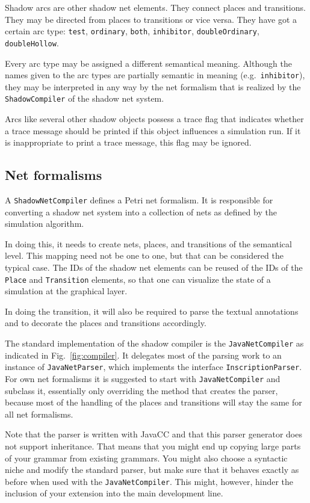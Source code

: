 Shadow arcs are other shadow net elements. They connect
places and transitions. They may be directed from places
to transitions or vice versa. They have got a certain
arc type: \texttt{test}, \texttt{ordinary}, \texttt{both},
\texttt{inhibitor}, \texttt{doubleOrdinary}, \texttt{doubleHollow}.


Every arc type may be assigned a different semantical meaning.
Although the names given to the arc types are partially
semantic in meaning (e.g.~\texttt{inhibitor}), they may be interpreted
in any way by the net formalism that is realized by
the \texttt{ShadowCompiler} of the shadow net system.

Arcs like several other shadow objects possess a trace flag
that indicates whether a trace message should be printed 
if this object influences a simulation run. If it is inappropriate to
print a trace message, this flag may be ignored.


\subsection{Net formalisms}

A \texttt{ShadowNetCompiler} defines a Petri net formalism.
It is responsible for converting a shadow net system into
a collection of nets as defined by the simulation algorithm.

In doing this, it needs to create nets, places, and transitions
of the semantical level. This mapping need not be one to one,
but that can be considered the typical case. 
The IDs of the shadow net elements can be reused of the IDs of the
\texttt{Place} and \texttt{Transition} elements, so that one
can visualize the state of a simulation at the graphical layer.

In doing the transition, it will also be required to
parse the textual annotations and to decorate the
places and transitions accordingly.


The standard implementation of the shadow compiler
is the \texttt{JavaNetCompiler} as indicated in
Fig.~\ref{fig:compiler}. It delegates most of the
parsing work to an instance of \texttt{JavaNetParser},
which implements the interface \texttt{InscriptionParser}.
For own net formalisms it is suggested to start with
\texttt{JavaNetCompiler} and subclass it, essentially
only overriding the method that creates the parser,
because most of the handling of the places and
transitions will stay the same for all net formalisms.

Note that the parser is written with JavaCC \cite{JavaCC}
and that this parser generator does not support inheritance.
That means that you might end up copying large parts of your 
grammar from existing grammars. You might also 
choose a syntactic niche and modify the standard
parser, but make sure that it behaves exactly as before
when used with the \texttt{JavaNetCompiler}.
This might, however, hinder the inclusion of your extension
into the main development line.


